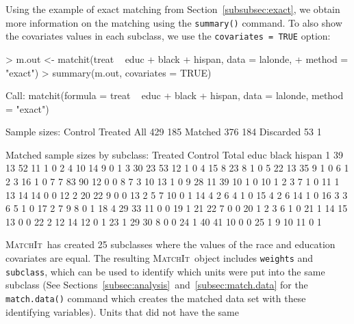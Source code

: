 \documentclass[oneside,letterpaper,titlepage]{article}
\newcommand{\MatchIt}{\textsc{MatchIt}}
\begin{document}
Using the example of exact matching from
  Section~\ref{subsubsec:exact}, we obtain more information on the
  matching using the {\tt summary()} command.  To also show the
  covariates values in each subclass, we use the \texttt{covariates =
    TRUE} option:
\begin{Schunk}
\begin{Sinput}
> m.out <- matchit(treat ~ educ + black + hispan, data = lalonde, 
+     method = "exact")
> summary(m.out, covariates = TRUE)
\end{Sinput}
\begin{Soutput}
Call:
matchit(formula = treat ~ educ + black + hispan, data = lalonde, 
    method = "exact")

Sample sizes:
          Control Treated
All           429     185
Matched       376     184
Discarded      53       1

Matched sample sizes by subclass:
   Treated Control Total educ black hispan
1       39      13    52   11     1      0
2        4      10    14    9     0      1
3       30      23    53   12     1      0
4       15       8    23    8     1      0
5       22      13    35    9     1      0
6        1       2     3   16     1      0
7        7      83    90   12     0      0
8        7       3    10   13     1      0
9       28      11    39   10     1      0
10       1       2     3    7     1      0
11       1      13    14   14     0      0
12       2      20    22    9     0      0
13       2       5     7   10     0      1
14       4       2     6    4     1      0
15       4       2     6   14     1      0
16       3       3     6    5     1      0
17       2       7     9    8     0      1
18       4      29    33   11     0      0
19       1      21    22    7     0      0
20       1       2     3    6     1      0
21       1      14    15   13     0      0
22       2      12    14   12     0      1
23       1      29    30    8     0      0
24       1      40    41   10     0      0
25       1       9    10   11     0      1
\end{Soutput}
\end{Schunk}
\MatchIt\ has created 25 subclasses where the values of the race and
education covariates are equal.  The resulting \MatchIt\ object
includes \texttt{weights} and \texttt{subclass}, which can be used to
identify which units were put into the same subclass (See
Sections~\ref{subsec:analysis}~and~\ref{subsec:match.data} for the
{\tt match.data()} command which creates the matched data set with
these identifying variables).  Units that did not have the same
\end{document}
